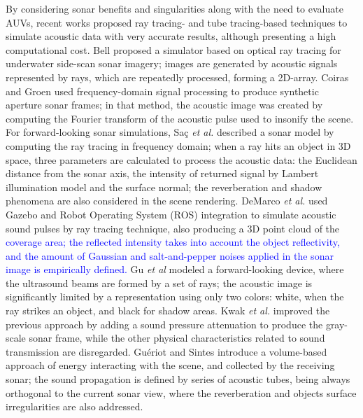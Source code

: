 \documentclass[final,5p,times]{elsarticle}
\begin{document}
By considering sonar benefits and singularities along with the need to evaluate AUVs, recent works proposed ray tracing- \cite{bell1997,coiras2009,sac2015,demarco2015,gu2013,kwak2015}
and tube tracing-based \cite{gueriot2010} techniques to simulate acoustic data
with very accurate results, although presenting a high computational cost.
Bell \cite{bell1997} proposed a simulator based on optical ray tracing for
underwater side-scan sonar imagery; images are generated by acoustic
signals represented by rays, which are repeatedly processed, forming a
2D-array. Coiras and Groen \cite{coiras2009} used frequency-domain
signal processing to produce synthetic aperture sonar frames; in that method,
the acoustic image was created by computing the Fourier transform of the
acoustic pulse used to insonify the scene. For forward-looking sonar
simulations, Saç \textit{et al.}
\cite{sac2015} described a sonar model by computing the ray tracing in
frequency domain; when a ray hits an object in 3D space, three parameters
are calculated to process the acoustic data: the Euclidean distance from
the sonar axis, the intensity of returned signal by Lambert illumination
model and the surface normal; the reverberation and shadow phenomena are
also considered in the scene rendering. DeMarco \textit{et al.}
\cite{demarco2015} used Gazebo and Robot Operating System (ROS)
\cite{quigley2009} integration to simulate acoustic sound pulses by
ray tracing technique, also producing a 3D point cloud of the \textcolor{blue}{coverage area; the reflected intensity takes into account the object reflectivity, and the amount of Gaussian and salt-and-pepper noises applied in the sonar image is empirically defined.} Gu \textit{et al} \cite{gu2013} modeled a forward-looking device, where the ultrasound beams are formed by a set of rays; the acoustic image is significantly limited by a representation using only two colors: white, when the ray strikes an object, and black for shadow areas. Kwak \textit{et al.} \cite{kwak2015} improved the previous approach by adding a sound pressure attenuation to produce the gray-scale sonar frame, while the other physical characteristics related to sound transmission are disregarded. Guériot and Sintes \cite{gueriot2010} introduce a volume-based
approach of energy interacting with the scene, and collected by the receiving
sonar; the sound propagation is defined by series of acoustic tubes, being
always orthogonal to the current sonar view, where the reverberation and
objects surface irregularities are also addressed.
\end{document}
